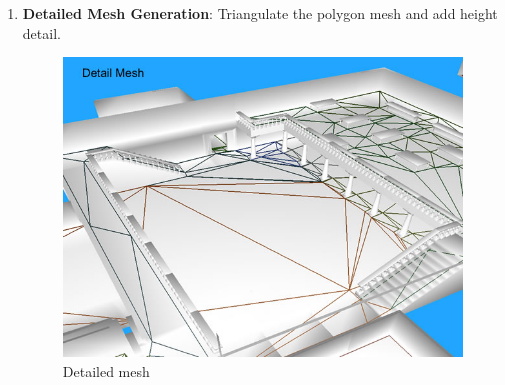 \begin{enumerate}
  
  
  
  
  \item\textbf{Detailed Mesh Generation}: Triangulate the polygon mesh and add height detail.
  
  \begin{figure}[H]
	\centering
	\includegraphics[width=1\textwidth]{../images/stage_detail_mesh.png}
	\caption{Detailed mesh}
\end{figure}  
  
\end{enumerate}


